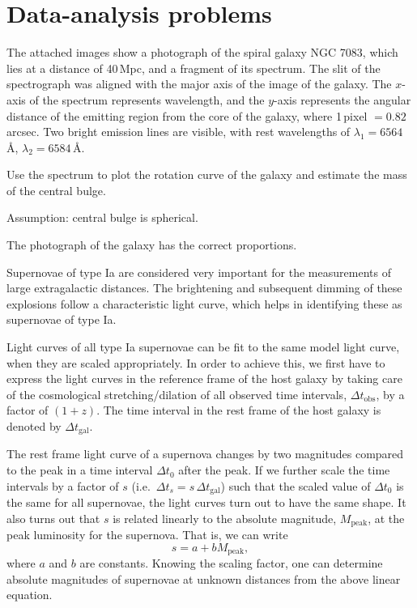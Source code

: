 \section*{Data-analysis problems}

The attached images show a photograph of the spiral galaxy NGC 7083, which
lies at a distance of 40\,Mpc, and a fragment of its spectrum. The slit of the
spectrograph was aligned with the major axis of the image of the galaxy. The
$x$-axis of the spectrum represents wavelength, and the $y$-axis represents
the angular distance of the emitting region from the core of the galaxy, where
1\,pixel $= 0.82$\,arcsec. Two bright emission lines are visible, with rest
wavelengths of $\lambda_1 = 6564$\,\AA, $\lambda_2 = 6584$\,\AA.

Use the spectrum to plot the rotation curve of the galaxy and estimate the
mass of the central bulge.

Assumption: central bulge is spherical.

The photograph of the galaxy has the correct proportions.

Supernovae of type Ia are considered very important for the measurements of
large extragalactic distances. The brightening and subsequent dimming of these
explosions follow a characteristic light curve, which helps in identifying
these as supernovae of type Ia.

Light curves of all type Ia supernovae can be fit to the same model light
curve, when they are scaled appropriately. In order to achieve this, we first
have to express the light curves in the reference frame of the host galaxy by
taking care of the cosmological stretching/dilation of all observed time
intervals, $\Delta t_{\mathrm{obs}}$, by a factor of $(1+z)$. The time
interval in the rest frame of the host galaxy is denoted by
$\Delta t_{\mathrm{gal}}$.

The rest frame light curve of a supernova changes by two magnitudes compared
to the peak in a time interval $\Delta t_0$ after the peak. If we further
scale the time intervals by a factor of $s$ (i.e.\
$\Delta t_s = s\,\Delta t_{\mathrm{gal}}$) such that the scaled value of
$\Delta t_0$ is the same for all supernovae, the light curves turn out to have
the same shape. It also turns out that $s$ is related linearly to the absolute
magnitude, $M_{\mathrm{peak}}$, at the peak luminosity for the supernova. That
is, we can write
\[ s = a + b M_{\mathrm{peak}}, \]
where $a$ and $b$ are constants. Knowing the scaling factor, one can determine
absolute magnitudes of supernovae at unknown distances from the above linear
equation.

